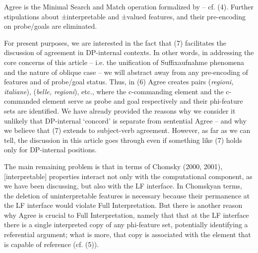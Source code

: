 \documentclass[output=paper]{langsci/langscibook}
\begin{document}
\ea%
    \label{ex:manzini:7}
    \ea Agree is the Minimal Search and Match operation formalized by \citet{Chomsky2000} – cf. (4). 
    \ex Further stipulations about ±interpretable and ±valued features, and their pre-encoding on probe/goals \citep{Chomsky2001} are eliminated.  
    \z
\z


For present purposes, we are interested in the fact that (7) facilitates the discussion of agreement in DP-internal contexts. In other words, in addressing the core concerns of this article – i.e. the unification of Suffixaufnahme phenomena and the nature of oblique case – we will abstract away from any pre-encoding of features and of probe/goal status. Thus, in (6) Agree creates pairs (\textit{regioni, italiane}), (\textit{belle, regioni}), etc., where the c-commanding element and the c-commanded element serve as probe and goal respectively and their phi-feature sets are identified. We have already provided the reasons why we consider it unlikely that DP-internal ‘concord’ is separate from sentential Agree – and why we believe that (7) extends to subject-verb agreement. However, as far as we can tell, the discussion in this article goes through even if something like (7) holds only for DP-internal positions. 

The main remaining problem is that in terms of Chomsky (2000, 2001), [interpretable] properties interact not only with the computational component, as we have been discussing, but also with the LF interface. In Chomskyan terms, the deletion of uninterpretable features is necessary because their permanence at the LF interface would violate Full Interpretation. But there is another reason why Agree is crucial to Full Interpretation, namely that {that at the LF interface there is a single interpreted copy of any phi-feature set, potentially identifying a referential argument; what is more, that copy is associated with the element that is capable of reference (cf. (5)).}
\end{document}
